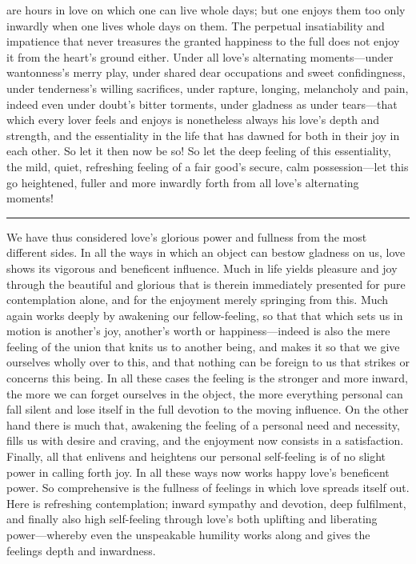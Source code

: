 \documentclass[12pt,a4paper]{book}
\begin{document}
are hours in love on which one can live whole days; but one enjoys them too
only inwardly when one lives whole days on them. The perpetual insatiability
and impatience that never treasures the granted happiness to the full does
not enjoy it from the heart's ground either. Under all love's alternating
moments---under wantonness's merry play, under shared dear occupations and
sweet confidingness, under tenderness's willing sacrifices, under rapture,
longing, melancholy and pain, indeed even under doubt's bitter torments,
under gladness as under tears---that which every lover feels and enjoys is
nonetheless always his love's depth and strength, and the essentiality in
the life that has dawned for both in their joy in each other. So let it then
now be so! So let the deep feeling of this essentiality, the mild, quiet,
refreshing feeling of a fair good's secure, calm possession---let this go
heightened, fuller and more inwardly forth from all love's alternating
moments!

\begin{center}\rule{0.28\linewidth}{0.4pt}\end{center}

We have thus considered love's glorious power and fullness from the most
different sides. In all the ways in which an object can bestow gladness on
us, love shows its vigorous and beneficent influence. Much in life yields
pleasure and joy through the beautiful and glorious that is therein
immediately presented for pure contemplation alone, and for the enjoyment
merely springing from this. Much again works deeply by awakening our
fellow-feeling, so that that which sets us in motion is another's joy,
another's worth or happiness---indeed is also the mere feeling of the union
that knits us to another being, and makes it so that we give ourselves
wholly over to this, and that nothing can be foreign to us that strikes or
concerns this being. In all these cases the feeling is the stronger and
more inward, the more we can forget ourselves in the object, the more
everything personal can fall silent and lose itself in the full devotion to
the moving influence. On the other hand there is much that, awakening the
feeling of a personal need and necessity, fills us with desire and craving,
and the enjoyment now consists in a satisfaction. Finally, all that
enlivens and heightens our personal self-feeling is of no slight power in
calling forth joy. In all these ways now works happy love's beneficent
power. So comprehensive is the fullness of feelings in which love spreads
itself out. Here is refreshing contemplation; inward sympathy and devotion,
deep fulfilment, and finally also high self-feeling through love's both
uplifting and liberating power---whereby even the unspeakable humility works
along and gives the feelings depth and inwardness.
\end{document}
